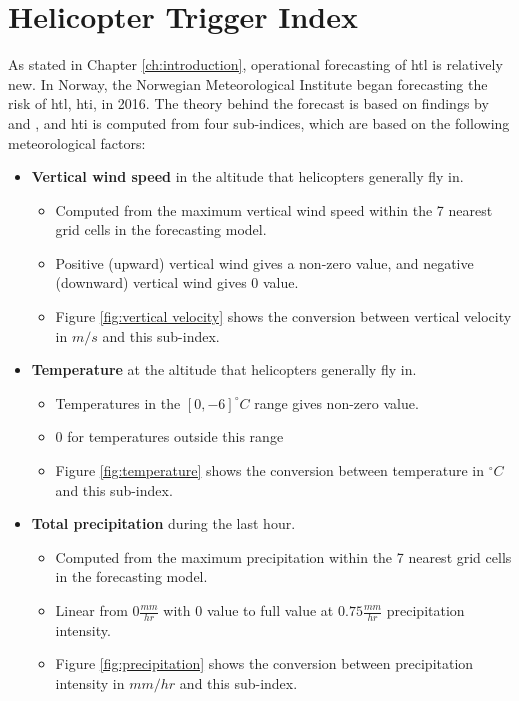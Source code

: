 \section{Helicopter Trigger Index}\label{sec:hti}
As stated in Chapter \ref{ch:introduction}, operational forecasting of \acrshort{htl} is relatively new. In Norway, the Norwegian Meteorological Institute began forecasting the risk of \acrshort{htl}, \acrfull{hti}, in 2016. The theory behind the forecast is based on findings by \cite{hardwick1999} and \cite{wilkinson2013}, and \acrshort{hti} is computed from four sub-indices, which are based on the following meteorological factors:
\begin{itemize}
    \item \textbf{Vertical wind speed} in the altitude that helicopters generally fly in.
    \begin{itemize}
        \item Computed from the maximum vertical wind speed within the 7 nearest grid cells in the forecasting model.
        \item Positive (upward) vertical wind gives a non-zero value, and negative (downward) vertical wind gives 0 value.
        \item Figure \ref{fig:vertical velocity} shows the conversion between vertical velocity in $m/s$ and this sub-index.
    \end{itemize}
    \item \textbf{Temperature} at the altitude that helicopters generally fly in.
    \begin{itemize}
        \item Temperatures in the $[0,-6] ^{\circ}C$ range gives non-zero value. 
        \item 0 for temperatures outside this range
        \item Figure \ref{fig:temperature} shows the conversion between temperature in $^{\circ}C$ and this sub-index.
    \end{itemize}
    \item \textbf{Total precipitation} during the last hour.
    \begin{itemize}
        \item Computed from the maximum precipitation within the 7 nearest grid cells in the forecasting model.
        \item Linear from $0\frac{mm}{hr}$ with 0 value to full value at $0.75\frac{mm}{hr}$ precipitation intensity.
        \item Figure \ref{fig:precipitation} shows the conversion between precipitation intensity in $mm/hr$ and this sub-index.

\end{itemize}
\end{itemize}
